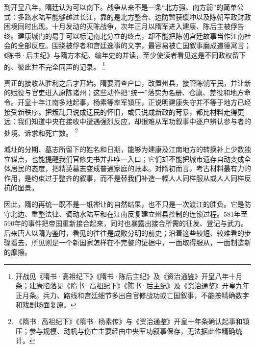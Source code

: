 到开皇八年，隋廷认为可以南下。战争从来不是一条“北方强、南方弱”的简单公式：多路水陆军能够越过长江，靠的是北方整合、边防暂获缓冲以及陈朝军政财政困境同时出现。十月发动的灭陈战争，次年正月以隋军进入建康、陈后主被俘告终。建康城门的易手可以标记南北分立的终点，却不能把陈朝宫廷故事当作江南社会的全部反应。围绕被俘者和宫廷逸事的文字，最容易被亡国叙事磨成道德寓言；《陈书·后主纪》与隋方本纪、编年史的并读，至少使读者看见这是不同政权留下的、彼此并不完全同声的记录。%
\footnote{开战见《隋书·高祖纪下》《隋书·陈后主纪》及《资治通鉴》开皇八年十月条；建康陷落见《隋书·高祖纪下》《陈书·后主纪》及《资治通鉴》开皇九年正月条。兵力、路线和宫廷细节多出自官修战功或亡国叙事，不能按精确数字和戏剧场面复原。}

真正的接收从胜利之后才开始。隋要清查户口，改置州县，接管陈朝军民，并让新的赋役与官吏进入原陈诸州；这些动作把“统一”落实为名册、仓廪、差役和地方命令。开皇十年江南多地起事，杨素等率军镇压，正说明建康失守并不等于地方已经接受新秩序。把叛乱只说成遗民的怀旧，或只说成新政的苛暴，都比材料走得更远：我们知道中央在接收中遭遇强烈反应，却很难从军功叙事中逐户辨认参与者的处境、诉求和死亡数。%
\footnote{《隋书·高祖纪下》《隋书·杨素传》与《资治通鉴》开皇十年条确认起事和镇压；参与规模、动机与伤亡主要经由中央军功叙事保存，无法据此作精确统计。}

城址的分期、墓志所留下的姓名和日期，能够为建康及江南地方的转换补上少数独立锚点，也能提醒我们官修史书并非唯一入口；它们却不能把城市遗存自动变成全体居民的态度，把精英墓志变成普通家庭的账本。对隋初而言，考古材料最有力的作用，是约束过于整齐的叙事，而不是替我们补造一幅人人同样服从或人人同样反抗的图景。

因此，隋的再统一既不是一纸禅让的自然结果，也不只是一次渡江的胜负。它是防守北边、重整法律、调动水陆军和在江南反复建立州县控制的连锁过程。581年至590年的事件把帝国重新接合起来，同时也暴露出接合所需的征发、登记与武力。后来唐人以隋为鉴时，看见的往往是成败分明的前史；沿着这些较短、较难看的步骤看去，所见则是一个新国家怎样在不完整的证据中，一面取得服从，一面制造新的摩擦。
